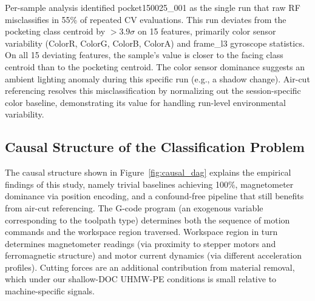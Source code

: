Per-sample analysis identified pocket150025\_001 as the single run that raw RF misclassifies in 55\% of repeated CV evaluations. This run deviates from the pocketing class centroid by $> 3.9\sigma$ on 15 features, primarily color sensor variability (ColorR, ColorG, ColorB, ColorA) and frame\_l3 gyroscope statistics. On all 15 deviating features, the sample's value is closer to the facing class centroid than to the pocketing centroid. The color sensor dominance suggests an ambient lighting anomaly during this specific run (e.g., a shadow change). Air-cut referencing resolves this misclassification by normalizing out the session-specific color baseline, demonstrating its value for handling run-level environmental variability.

\subsection{Causal Structure of the Classification Problem}\label{sec:causal_dag}

The causal structure shown in Figure~\ref{fig:causal_dag} explains the empirical findings of this study, namely trivial baselines achieving 100\%, magnetometer dominance via position encoding, and a confound-free pipeline that still benefits from air-cut referencing. The G-code program (an exogenous variable corresponding to the toolpath type) determines both the sequence of motion commands and the workspace region traversed. Workspace region in turn determines magnetometer readings (via proximity to stepper motors and ferromagnetic structure) and motor current dynamics (via different acceleration profiles). Cutting forces are an additional contribution from material removal, which under our shallow-DOC UHMW-PE conditions is small relative to machine-specific signals.

